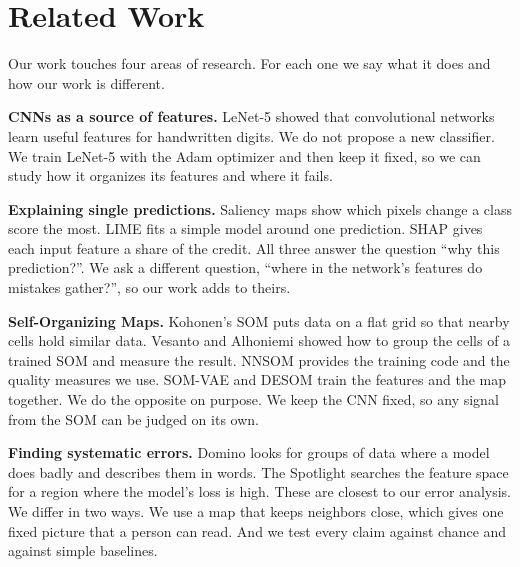 \documentclass[11pt]{article}
\begin{document}
\section{Related Work}

Our work touches four areas of research. For each one we say what it does and how our work is different.

\textbf{CNNs as a source of features.} LeNet-5 \parencite{lecun1998gradient} showed that convolutional networks learn useful features for handwritten digits. We do not propose a new classifier.
We train LeNet-5 with the Adam optimizer \parencite{kingma2015adam} and then keep it fixed, so we can study how it organizes its features and where it fails.

\textbf{Explaining single predictions.} Saliency maps \parencite{simonyan2014saliency} show which pixels change a class score the most. LIME \parencite{ribeiro2016lime} fits a simple model around one prediction.
SHAP \parencite{lundberg2017shap} gives each input feature a share of the credit. All three answer the question ``why this prediction?''. We ask a different question, ``where in the network's features do mistakes gather?'', so our work adds to theirs.

\textbf{Self-Organizing Maps.} Kohonen's SOM \parencite{kohonen1990som} puts data on a flat grid so that nearby cells hold similar data. Vesanto and Alhoniemi \parencite{vesanto2000clustering} showed how to group the cells of a trained SOM and measure the result.
NNSOM \parencite{jafari_nnsom} provides the training code and the quality measures we use. SOM-VAE \parencite{fortuin2019somvae} and DESOM \parencite{forest2021desom} train the features and the map together.
We do the opposite on purpose. We keep the CNN fixed, so any signal from the SOM can be judged on its own.

\textbf{Finding systematic errors.} Domino \parencite{eyuboglu2022domino} looks for groups of data where a model does badly and describes them in words. The Spotlight \parencite{deon2022spotlight} searches the feature space for a region where the model's loss is high.
These are closest to our error analysis. We differ in two ways. We use a map that keeps neighbors close, which gives one fixed picture that a person can read. And we test every claim against chance and against simple baselines.
\end{document}
